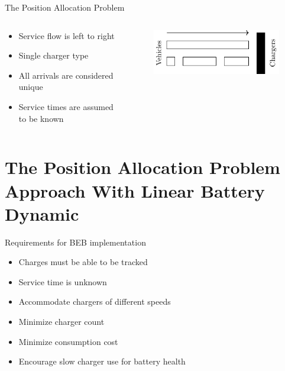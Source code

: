 \documentclass[bigger]{beamer}
\begin{document}
\begin{frame}[label={sec:org3450988}]{The Position Allocation Problem}
\begin{columns}
\begin{column}{0.5\columnwidth}
\begin{itemize}
\item Service flow is left to right
\item Single charger type
\item All arrivals are considered unique
\item Service times are assumed to be known
\end{itemize}
\end{column}

\begin{column}{0.5\columnwidth}
\begin{figure}[htpb]
\centering
    \includegraphics{img/pap}
    \label{subfig:papexample}
\end{figure}
\end{column}
\end{columns}
\end{frame}

\section{The Position Allocation Problem Approach With Linear Battery Dynamic}
\label{sec:orgccfa8fe}
\begin{frame}[label={sec:orga8a9c62}]{Requirements for BEB implementation}
\begin{itemize}
\item Charges must be able to be tracked
\item Service time is unknown
\item Accommodate chargers of different speeds
\item Minimize charger count
\item Minimize consumption cost
\item Encourage slow charger use for battery health
\end{itemize}
\end{frame}
\end{document}
